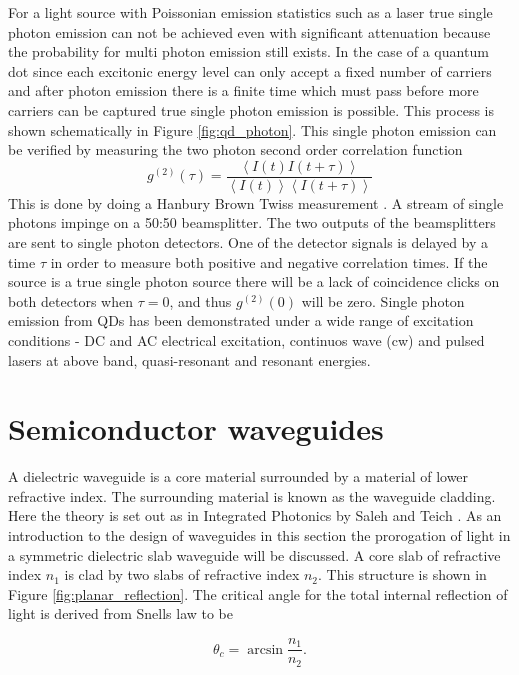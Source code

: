 For a light source with Poissonian emission statistics such as a laser true
single photon emission can not be achieved even with significant attenuation
because the probability for multi photon emission still exists. In the case of a
quantum dot since each excitonic energy level can only accept a fixed number of
carriers and after photon emission there is a finite time which must pass before
more carriers can be captured true single photon emission is possible. This
process is shown schematically in Figure \ref{fig:qd_photon}. This single photon
emission can be verified by measuring the two photon second order correlation
function \begin{equation} g^{(2)}(\tau) = \frac{\left\langle I(t)I(t+\tau)
\right\rangle}{\left\langle I(t) \right\rangle \left\langle I(t+\tau)
\right\rangle} \end{equation} This is done by doing a Hanbury Brown Twiss
measurement \cite{brown1956test}. A stream of single photons impinge on a 50:50 beamsplitter. The two
outputs of the beamsplitters are sent to single photon detectors. One of the
detector signals is delayed by a time $\tau$ in order to measure both positive
and negative correlation times. If the source is a true single photon source
there will be a lack of coincidence clicks on both detectors when $\tau = 0$,
and thus $g^{(2)}(0)$ will be zero. Single photon emission from QDs has been
demonstrated under a wide range of excitation conditions - DC and AC electrical
excitation, continuos wave (cw) and pulsed lasers at above band, quasi-resonant
and resonant energies.

\section{Semiconductor waveguides}

A dielectric waveguide is a core material surrounded by a material of lower
refractive index. The surrounding material is known as the waveguide cladding.
Here the theory is set out as in Integrated Photonics by Saleh and Teich
\cite{saleh1991fundamentals}. As an introduction to the design of waveguides in
this section the prorogation of light in a symmetric dielectric slab waveguide
will be discussed. A core slab of refractive index $n_1$ is clad by two slabs of
refractive index $n_2$. This structure is shown in Figure
\ref{fig:planar_reflection}. The critical angle for the total internal
reflection of light is derived from Snells law to be

\begin{equation} \theta_c = \arcsin{\frac{n_1}{n_2}}. \end{equation}

